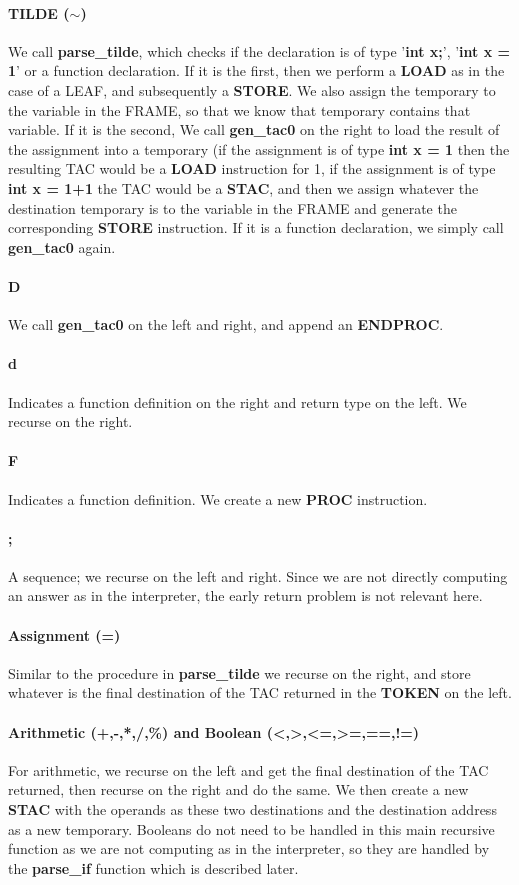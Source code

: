 \documentclass[12pt]{article}
\begin{document}
\paragraph{TILDE ($\sim$)} We call \textbf{parse\_tilde}, which checks if the declaration is of type '\textbf{int x;}', '\textbf{int x = 1}' or a function declaration. If it is the first, then we perform a \textbf{LOAD} as in the case of a LEAF, and subsequently a \textbf{STORE}. We also assign the temporary to the variable in the FRAME, so that we know that temporary contains that variable. If it is the second, 
We call \textbf{gen\_tac0} on the right to load the result of the assignment into a temporary (if the assignment is of type \textbf{int x = 1} then the resulting TAC would be a \textbf{LOAD} instruction for 1, if the assignment is of type \textbf{int x = 1+1} the TAC would be a \textbf{STAC}, and then we assign whatever the destination temporary is to the variable in the FRAME and generate the corresponding \textbf{STORE} instruction. If it is a function declaration, we simply call \textbf{gen\_tac0} again.
\paragraph{D} We call \textbf{gen\_tac0} on the left and right, and append an \textbf{ENDPROC}. 
\paragraph{d} Indicates a function definition on the right and return type on the left. We recurse on the right.
\paragraph{F} Indicates a function definition. We create a new \textbf{PROC} instruction.
\paragraph{;} A sequence; we recurse on the left and right. Since we are not directly computing an answer as in the interpreter, the early return problem is not relevant here. 
\paragraph{Assignment (=)} Similar to the procedure in \textbf{parse\_tilde} we recurse on the right, and store whatever is the final destination of the TAC returned in the \textbf{TOKEN} on the left.
\paragraph{Arithmetic (+,-,*,/,\%) and Boolean (<,>,<=,>=,==,!=)} For arithmetic, we recurse on the left and get the final destination of the TAC returned, then recurse on the right and do the same. We then create a new \textbf{STAC} with the operands as these two destinations and the destination address as a new temporary. Booleans do not need to be handled in this main recursive function as we are not computing as in the interpreter, so they are handled by the \textbf{parse\_if} function which is described later. 
\end{document}
